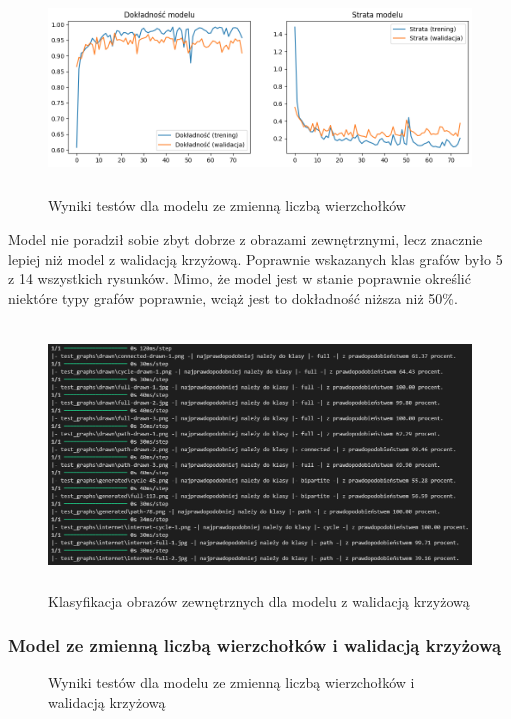 \begin{figure}[ht]
	\centering
	\includegraphics[height=5.5cm]{partials/images/tests/v2_multiple_edges_epoch75.png}
	\caption{Wyniki testów dla modelu ze zmienną liczbą wierzchołków}
	\label{Fig:tests-var-1}
\end{figure}
\FloatBarrier

Model nie poradził sobie zbyt dobrze z obrazami zewnętrznymi, lecz znacznie lepiej niż model z walidacją krzyżową.
Poprawnie wskazanych klas grafów było 5 z 14 wszystkich rysunków.
Mimo, że model jest w stanie poprawnie określić niektóre typy grafów poprawnie,
wciąż jest to dokładność niższa niż 50\%.

\begin{figure}[ht]
	\centering
	\includegraphics[height=7cm]{partials/images/tests/v2_multiple_edges_epoch75_img_tests.png}
	\caption{Klasyfikacja obrazów zewnętrznych dla modelu z walidacją krzyżową}
	\label{Fig:tests-var-2}
\end{figure}
\FloatBarrier

\subsubsection{Model ze zmienną liczbą wierzchołków i walidacją krzyżową}

\begin{figure}[ht]
	\centering
	\caption{Wyniki testów dla modelu ze zmienną liczbą wierzchołków i walidacją krzyżową}
	\label{Fig:tests-csvar-1}
\end{figure}
\FloatBarrier

